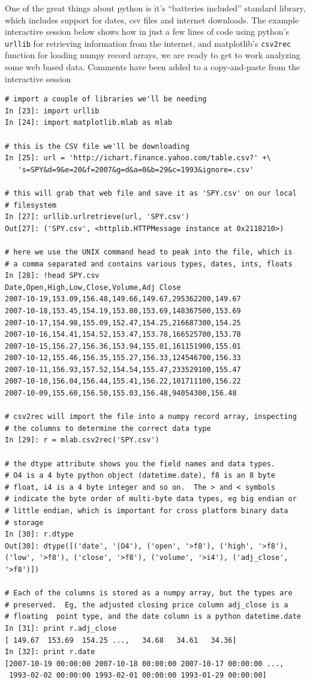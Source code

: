 One of the great things about python is it's ``batteries included''
standard library, which includes support for dates, csv files and
internet downloads.  The example interactive session below shows how
in just a few lines of code using python's \texttt{urllib} for
retrieving information from the internet, and matplotlib's
\texttt{csv2rec} function for loading numpy record arrays, we are
ready to get to work analyzing some web based data.  Comments have
been added to a copy-and-paste from the interactive session

\begin{lstlisting}
# import a couple of libraries we'll be needing
In [23]: import urllib
In [24]: import matplotlib.mlab as mlab

# this is the CSV file we'll be downloading
In [25]: url = 'http://ichart.finance.yahoo.com/table.csv?' +\
   's=SPY&d=9&e=20&f=2007&g=d&a=0&b=29&c=1993&ignore=.csv'

# this will grab that web file and save it as 'SPY.csv' on our local
# filesystem
In [27]: urllib.urlretrieve(url, 'SPY.csv')
Out[27]: ('SPY.csv', <httplib.HTTPMessage instance at 0x2118210>)

# here we use the UNIX command head to peak into the file, which is
# a comma separated and contains various types, dates, ints, floats
In [28]: !head SPY.csv
Date,Open,High,Low,Close,Volume,Adj Close
2007-10-19,153.09,156.48,149.66,149.67,295362200,149.67
2007-10-18,153.45,154.19,153.08,153.69,148367500,153.69
2007-10-17,154.98,155.09,152.47,154.25,216687300,154.25
2007-10-16,154.41,154.52,153.47,153.78,166525700,153.78
2007-10-15,156.27,156.36,153.94,155.01,161151900,155.01
2007-10-12,155.46,156.35,155.27,156.33,124546700,156.33
2007-10-11,156.93,157.52,154.54,155.47,233529100,155.47
2007-10-10,156.04,156.44,155.41,156.22,101711100,156.22
2007-10-09,155.60,156.50,155.03,156.48,94054300,156.48

# csv2rec will import the file into a numpy record array, inspecting
# the columns to determine the correct data type
In [29]: r = mlab.csv2rec('SPY.csv')

# the dtype attribute shows you the field names and data types.  
# O4 is a 4 byte python object (datetime.date), f8 is an 8 byte 
# float, i4 is a 4 byte integer and so on.  The > and < symbols
# indicate the byte order of multi-byte data types, eg big endian or
# little endian, which is important for cross platform binary data
# storage
In [30]: r.dtype
Out[30]: dtype([('date', '|O4'), ('open', '>f8'), ('high', '>f8'),
('low', '>f8'), ('close', '>f8'), ('volume', '>i4'), ('adj_close',
'>f8')])

# Each of the columns is stored as a numpy array, but the types are 
# preserved.  Eg, the adjusted closing price column adj_close is a
# floating  point type, and the date column is a python datetime.date
In [31]: print r.adj_close
[ 149.67  153.69  154.25 ...,   34.68   34.61   34.36]
In [32]: print r.date
[2007-10-19 00:00:00 2007-10-18 00:00:00 2007-10-17 00:00:00 ...,
 1993-02-02 00:00:00 1993-02-01 00:00:00 1993-01-29 00:00:00]
\end{lstlisting}

